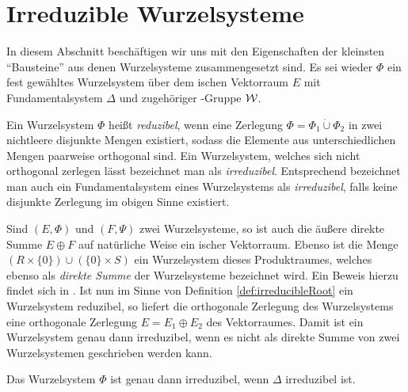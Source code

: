 \section{Irreduzible Wurzelsysteme}
\label{sec:irreduc}

In diesem Abschnitt beschäftigen wir uns mit den Eigenschaften der kleinsten ``Bausteine'' aus denen Wurzelsysteme zusammengesetzt sind.
Es sei wieder $\Phi$ ein fest gewähltes Wurzelsystem über dem \euklid ischen Vektorraum $E$ mit Fundamentalsystem $\Delta$ und zugehöriger \weyl\hyp{}Gruppe $\mathcal{W}$.

\begin{defn}
  \label{def:irreducibleRoot}
  Ein Wurzelsystem $\Phi$ heißt \emph{reduzibel}, wenn eine Zerlegung $\Phi = \Phi_1 \dot{\cup} \Phi_2$ in zwei nichtleere disjunkte Mengen existiert, sodass die Elemente aus unterschiedlichen Mengen paarweise orthogonal sind.
  Ein Wurzelsystem, welches sich nicht orthogonal zerlegen lässt bezeichnet man als \emph{irreduzibel}.
  Entsprechend bezeichnet man auch ein Fundamentalsystem eines Wurzelsystems als \emph{irreduzibel}, falls keine disjunkte Zerlegung im obigen Sinne existiert.
\end{defn}

\begin{bem}
  Sind $(E,\Phi)$ und $(F,\Psi)$ zwei Wurzelsysteme, so ist auch die äußere direkte Summe $E \oplus F$ auf natürliche Weise ein \euklid ischer Vektorraum.
  Ebenso ist die Menge $(R \times \{0\}) \cup (\{0\} \times S)$ ein Wurzelsystem dieses Produktraumes, welches ebenso als \emph{direkte Summe} der Wurzelsysteme bezeichnet wird.
  Ein Beweis hierzu findet sich in \cite[S.199]{hall2015lie}.
  Ist nun im Sinne von Definition \ref{def:irreducibleRoot} ein Wurzelsystem reduzibel, so liefert die orthogonale Zerlegung des Wurzelsystems eine orthogonale Zerlegung $E = E_1 \oplus E_2$ des Vektorraumes.
  Damit ist ein Wurzelsystem genau dann irreduzibel, wenn es nicht als direkte Summe von zwei Wurzelsystemen geschrieben werden kann.
\end{bem}

\begin{lem}
  \label{lem:irreducibleRoot}
  Das Wurzelsystem $\Phi$ ist genau dann irreduzibel, wenn $\Delta$ irreduzibel ist.
\end{lem}

